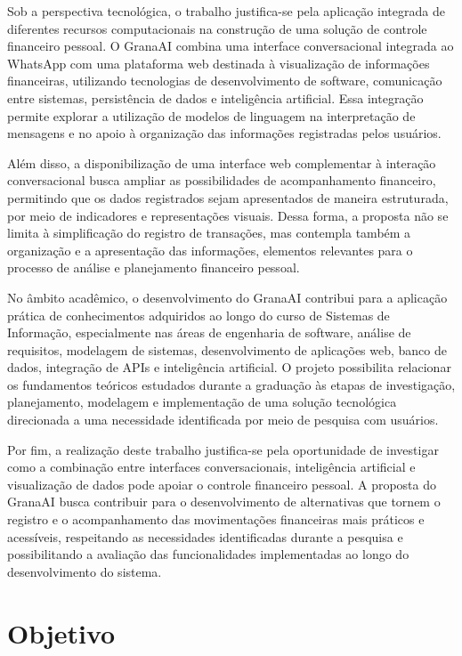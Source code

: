 Sob a perspectiva tecnológica, o trabalho justifica-se pela aplicação integrada de diferentes recursos computacionais na construção de uma solução de controle financeiro pessoal. O GranaAI combina uma interface conversacional integrada ao WhatsApp com uma plataforma web destinada à visualização de informações financeiras, utilizando tecnologias de desenvolvimento de software, comunicação entre sistemas, persistência de dados e inteligência artificial. Essa integração permite explorar a utilização de modelos de linguagem na interpretação de mensagens e no apoio à organização das informações registradas pelos usuários.

Além disso, a disponibilização de uma interface web complementar à interação conversacional busca ampliar as possibilidades de acompanhamento financeiro, permitindo que os dados registrados sejam apresentados de maneira estruturada, por meio de indicadores e representações visuais. Dessa forma, a proposta não se limita à simplificação do registro de transações, mas contempla também a organização e a apresentação das informações, elementos relevantes para o processo de análise e planejamento financeiro pessoal.

No âmbito acadêmico, o desenvolvimento do GranaAI contribui para a aplicação prática de conhecimentos adquiridos ao longo do curso de Sistemas de Informação, especialmente nas áreas de engenharia de software, análise de requisitos, modelagem de sistemas, desenvolvimento de aplicações web, banco de dados, integração de APIs e inteligência artificial. O projeto possibilita relacionar os fundamentos teóricos estudados durante a graduação às etapas de investigação, planejamento, modelagem e implementação de uma solução tecnológica direcionada a uma necessidade identificada por meio de pesquisa com usuários.

Por fim, a realização deste trabalho justifica-se pela oportunidade de investigar como a combinação entre interfaces conversacionais, inteligência artificial e visualização de dados pode apoiar o controle financeiro pessoal. A proposta do GranaAI busca contribuir para o desenvolvimento de alternativas que tornem o registro e o acompanhamento das movimentações financeiras mais práticos e acessíveis, respeitando as necessidades identificadas durante a pesquisa e possibilitando a avaliação das funcionalidades implementadas ao longo do desenvolvimento do sistema.

\section{Objetivo}

